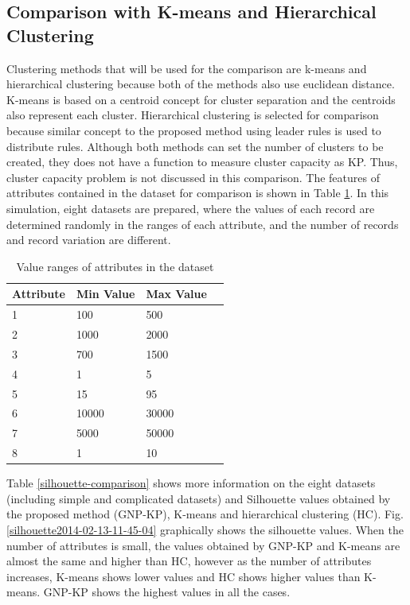 \documentclass[fleqn,10pt,twocolumn]{SICE14}
\begin{document}
\subsection{Comparison with K-means and Hierarchical Clustering}
Clustering methods that will be used for the comparison are k-means and hierarchical clustering because both of the methods also use euclidean distance. K-means is based on a centroid concept for cluster separation and the centroids also represent each cluster. Hierarchical clustering is selected for comparison because similar concept to the proposed method using leader rules is used to distribute rules.
Although both methods can set the number of clusters to be created, they does not have a function to measure cluster capacity as KP. Thus, cluster capacity problem is not discussed in this comparison.
The features of attributes contained in the dataset for comparison is shown in Table \ref{dataset-used-to-comparison}. 
In this simulation, eight datasets are prepared, where the values of each record are determined randomly in the ranges of each attribute,
and the number of records and record variation are different.

\begin{table}[tb]
\vspace{1em}
\caption{\label{dataset-used-to-comparison}Value ranges of attributes in the dataset}
\begin{center}
\begin{tabular}{|l|l|l|l|}
\hline 
Attribute & Min Value & Max Value\tabularnewline
\hline 
1 & 100 & 500\tabularnewline
\hline 
2 & 1000 & 2000\tabularnewline
\hline 
3 & 700 & 1500\tabularnewline
\hline 
4 & 1 & 5\tabularnewline
\hline 
5 & 15 & 95\tabularnewline
\hline 
6 & 10000 & 30000\tabularnewline
\hline 
7 & 5000 & 50000\tabularnewline
\hline 
8 & 1 & 10\tabularnewline
\hline 
\end{tabular}
\par\end{center}
\end{table}

Table \ref{silhouette-comparison} shows more information on the eight datasets (including simple and complicated datasets) and Silhouette values obtained by the proposed method (GNP-KP), K-means and hierarchical clustering (HC). 
Fig. \ref{silhouette2014-02-13-11-45-04} graphically shows the silhouette values. When the number of attributes is small, 
the values obtained by GNP-KP and K-means are almost the same and higher than HC, however as the number of attributes increases, K-means shows lower values and HC shows higher values than K-means. GNP-KP shows the highest values in all the cases.
\end{document}
